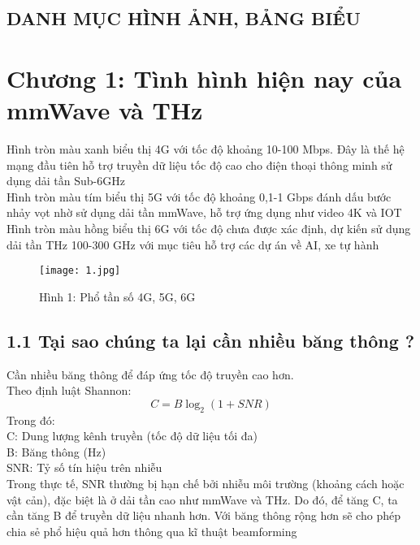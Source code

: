 \documentclass[a4paper,13pt]{article}
\begin{document}
\renewcommand{\contentsname}{}
\tableofcontents %
\clearpage

\begin{center}
\section{DANH MỤC HÌNH ẢNH, BẢNG BIỂU}
\end{center}
\listoffigures
\clearpage


\section{Chương 1: Tình hình hiện nay của mmWave và THz}
Hình tròn màu xanh biểu thị 4G với tốc độ khoảng 10-100 Mbps. Đây là thế hệ mạng đầu tiên hỗ trợ truyền dữ liệu tốc độ cao cho điện thoại thông minh sử dụng dải tần Sub-6GHz \\
Hình tròn màu tím biểu thị 5G với tốc độ khoảng 0,1-1 Gbps đánh dấu bước nhảy vọt nhờ sử dụng dải tần mmWave, hỗ trợ ứng dụng như video 4K và IOT \\
Hình tròn màu hồng biểu thị 6G với tốc độ chưa được xác định, dự kiến sử dụng dải tần THz 100-300 GHz với mục tiêu hỗ trợ các dự án về AI, xe tự hành
\begin{figure}[htbp]
    \centering
    \texttt{[image: 1.jpg]}
    \caption*{Hình 1: Phổ tần số 4G, 5G, 6G \cite{key1} }
    \label{fig:model}
\end{figure}
\subsection{1.1 Tại sao chúng ta lại cần nhiều băng thông ?}
Cần nhiều băng thông để đáp ứng tốc độ truyền cao hơn. \\ Theo định luật Shannon: 
\begin{equation}
C = B \log_2(1 + SNR) \tag{1}
\end{equation}
Trong đó: \\
C: Dung lượng kênh truyền (tốc độ dữ liệu tối đa) \\
B: Băng thông (Hz) \\
SNR: Tỷ số tín hiệu trên nhiễu\\

Trong thực tế, SNR thường bị hạn chế bởi nhiễu môi trường (khoảng cách hoặc vật cản), đặc biệt là ở dải tần cao như mmWave và THz. Do đó, để tăng C, ta cần tăng B để truyền dữ liệu nhanh hơn. Với băng thông rộng hơn sẽ cho phép chia sẻ phổ hiệu quả hơn thông qua kĩ thuật beamforming\\
\end{document}
